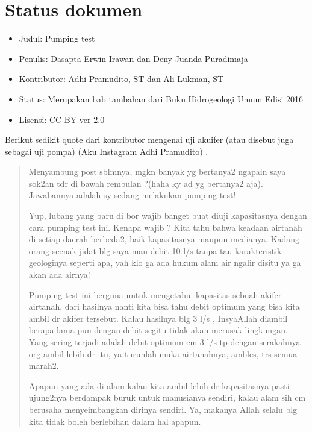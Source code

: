 \section{Status dokumen}

\begin{itemize}
\item Judul: Pumping test
\end{itemize}
\begin{itemize}
\item Penulis: Dasapta Erwin Irawan dan Deny Juanda Puradimaja
\end{itemize}
\begin{itemize}
\item Kontributor: Adhi Pramudito, ST dan Ali Lukman, ST
\end{itemize}
\begin{itemize}
\item Status: Merupakan bab tambahan dari Buku Hidrogeologi Umum Edisi 2016
\end{itemize}
\begin{itemize}
\item Lisensi: \href{http://creativecommons.org/licenses/by/2.0/}{CC-BY ver 2.0}
\end{itemize}

Berikut sedikit quote dari kontributor mengenai uji akuifer (atau disebut juga sebagai uji pompa) (Aku Instagram Adhi Pramudito) .

\begin{quote}
Menyambung post sblmnya, mgkn banyak yg bertanya2 ngapain saya sok2an tdr di bawah rembulan ?(haha ky ad yg bertanya2 aja). Jawabannya adalah sy sedang melakukan pumping test! 

Yup, lubang yang baru di bor wajib banget buat diuji kapasitasnya dengan cara pumping test ini. Kenapa wajib ? Kita tahu bahwa keadaan airtanah di setiap daerah berbeda2, baik kapasitasnya maupun medianya. Kadang orang seenak jidat blg saya mau debit 10 l/s tanpa tau karakteristik geologinya seperti apa, yah klo ga ada hukum alam air ngalir disitu ya ga akan ada airnya!

Pumping test ini berguna untuk mengetahui kapasitas sebuah akifer airtanah, dari hasilnya nanti kita bisa tahu debit optimum yang bisa kita ambil dr akifer tersebut. Kalau hasilnya blg 3 l/s , InsyaAllah diambil berapa lama pun dengan debit segitu tidak akan merusak lingkungan. Yang sering terjadi adalah debit optimum cm 3 l/s tp dengan serakahnya org ambil lebih dr itu, ya turunlah muka airtanahnya, ambles, trs semua marah2.

Apapun yang ada di alam kalau kita ambil lebih dr kapasitasnya pasti ujung2nya berdampak buruk untuk manusianya sendiri, kalau alam sih cm berusaha menyeimbangkan dirinya sendiri. Ya, makanya Allah selalu blg kita tidak boleh berlebihan dalam hal apapun.
\end{quote}



